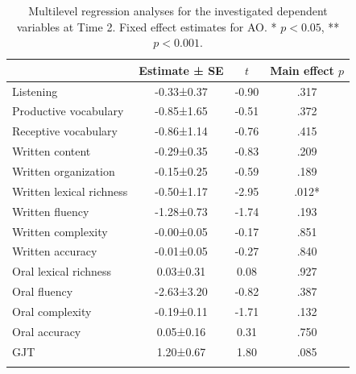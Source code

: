 \documentclass[output=paper,modfonts,nonflat,newtxmath]{langsci/langscibook}
\begin{document}
\begin{table}
    \caption{\label{tab:pfenninger:7}Multilevel regression analyses for the investigated dependent variables at Time 2. Fixed effect estimates for AO. * $p <0.05$, ** $p<0.001$.}
    \begin{tabular}{lS[table-format=-1.3,parse-numbers=false]SS[table-format=<1.4]}
    \lsptoprule
& {Estimate ± SE} & {$t$}  & {Main effect $p$}\\\midrule
Listening  & -0.33±0.37 & -0.90 & .317\\
Productive vocabulary & -0.85±1.65 & -0.51 & .372 \\
 Receptive vocabulary & -0.86±1.14 & -0.76 & .415\\
Written content & -0.29±0.35 & -0.83 & .209\\
 Written organization & -0.15±0.25 & -0.59 & .189\\
 Written lexical richness & -0.50±1.17 & -2.95 & .012*\\
 Written fluency & -1.28±0.73 & -1.74 & .193\\
 Written complexity & -0.00±0.05 & -0.17 & .851\\
 Written accuracy & -0.01±0.05 & -0.27 & .840\\
 Oral lexical richness & 0.03±0.31 & 0.08 & .927\\
 Oral fluency & -2.63±3.20 & -0.82 & .387\\
 Oral complexity & -0.19±0.11 & -1.71 & .132\\
 Oral accuracy & 0.05±0.16 & 0.31 & .750\\
 GJT & 1.20±0.67 & 1.80 & .085\\
\lspbottomrule
\end{tabular}
\end{table}
\end{document}
